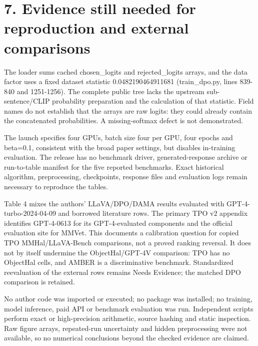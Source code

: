 \documentclass[10pt]{article}
\begin{document}
\section*{7. Evidence still needed for reproduction and external comparisons}
The loader sums cached chosen\_logits and rejected\_logits arrays, and the data factor uses a fixed dataset statistic 0.0482190464911681 (train\_dpo.py, lines 839-840 and 1251-1256). The complete public tree lacks the upstream sub-sentence/CLIP probability preparation and the calculation of that statistic. Field names do not establish that the arrays are raw logits: they could already contain the concatenated probabilities. A missing-softmax defect is not demonstrated.\par
The launch specifies four GPUs, batch size four per GPU, four epochs and beta=0.1, consistent with the broad paper settings, but disables in-training evaluation. The release has no benchmark driver, generated-response archive or run-to-table manifest for the five reported benchmarks. Exact historical algorithm, preprocessing, checkpoints, response files and evaluation logs remain necessary to reproduce the tables.\par
Table 4 mixes the authors’ LLaVA/DPO/DAMA results evaluated with GPT-4-turbo-2024-04-09 and borrowed literature rows. The primary TPO v2 appendix identifies GPT-4-0613 for its GPT-4-evaluated components and the official evaluation site for MMVet. This documents a calibration question for copied TPO MMHal/LLaVA-Bench comparisons, not a proved ranking reversal. It does not by itself undermine the ObjectHal/GPT-4V comparison: TPO has no ObjectHal cells, and AMBER is a discriminative benchmark. Standardized reevaluation of the external rows remains Needs Evidence; the matched DPO comparison is retained.\par
No author code was imported or executed; no package was installed; no training, model inference, paid API or benchmark evaluation was run. Independent scripts perform exact or high-precision arithmetic, source hashing and static inspection. Raw figure arrays, repeated-run uncertainty and hidden preprocessing were not available, so no numerical conclusions beyond the checked evidence are claimed.\par
\end{document}
